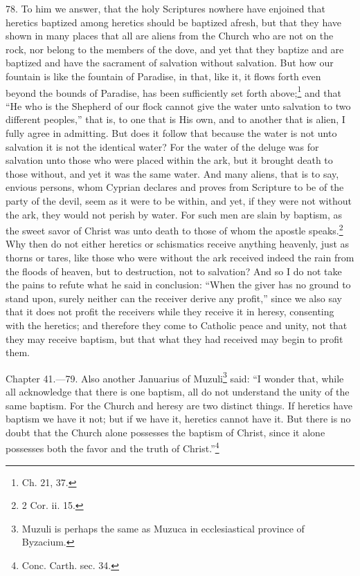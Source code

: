 78. To him we answer, that the holy Scriptures nowhere have enjoined that heretics baptized among heretics should be baptized afresh, but that they have shown in many places that all are aliens from the Church who are not on the rock, nor belong to the members of the dove, and yet that they baptize and are baptized and have the sacrament of salvation without salvation. But how our fountain is like the fountain of Paradise, in that, like it, it flows forth even beyond the bounds of Paradise, has been sufficiently set forth above;\footnote{\par  Ch. 21, 37.} and that ``He who is the Shepherd of our flock cannot give the water unto salvation to two different peoples,'' that is, to one that is His own, and to another that is alien, I fully agree in admitting. But does it follow that because the water is not unto salvation it is not the identical water? For the water of the deluge was for salvation unto those who were placed within the ark, but it brought death to those without, and yet it was the same water. And many aliens, that is to say, envious persons, whom Cyprian declares and proves from Scripture to be of the party of the devil, seem as it were to be within, and yet, if they were not without the ark, they would not perish by water. For such men are slain by baptism, as the sweet savor of Christ was unto death to those of whom the apostle speaks.\footnote{\par  2 Cor. ii. 15.} Why then do not either heretics or schismatics receive anything heavenly, just as thorns or tares, like those who were without the ark received indeed the rain from the floods of heaven, but to destruction, not to salvation? And so I do not take the pains to refute what he said in conclusion: ``When the giver has no ground to stand upon, surely neither can the receiver derive any profit,'' since we also say that it does not profit the receivers while they receive it in heresy, consenting with the heretics; and therefore they come to Catholic peace and unity, not that they may receive baptism, but that what they had received may begin to profit them.


Chapter 41.—79. Also another Januarius of Muzuli\footnote{\par  Muzuli is perhaps the same as Muzuca in ecclesiastical province of Byzacium.} said: ``I wonder that, while all acknowledge that there is one baptism, all do not understand the unity of the same baptism. For the Church and heresy are two distinct things. If heretics have baptism we have it not; but if we have it, heretics cannot have it. But there is no doubt that the Church alone possesses the baptism of Christ, since it alone possesses both the favor and the truth of Christ.''\footnote{\par  Conc. Carth. sec. 34.}

